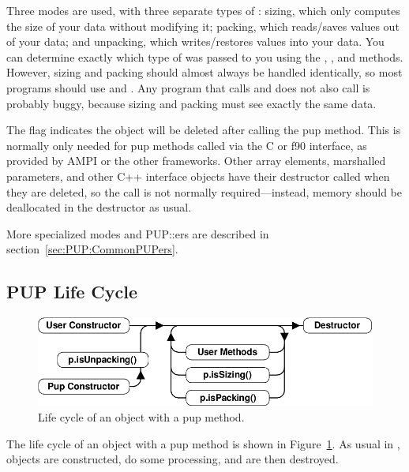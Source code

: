 Three modes are used, with three separate types of : 
sizing, which only computes the size of your data without modifying it;
packing, which reads/saves values out of your data; and unpacking,
which writes/restores values into your data.  You can determine
exactly which type of  was passed to you using the
, , and 
methods. However, sizing and packing should almost always be 
handled identically, so most programs should use 
and .  Any program that calls  
and does not also call  is probably buggy, because
sizing and packing must see exactly the same data.


The  flag indicates the object will be deleted
after calling the pup method.  This is normally only needed for
pup methods called via the C or f90 interface, as provided by 
AMPI or the other frameworks.  Other \charmpp{} array elements, 
marshalled parameters, and other C++ interface objects 
have their destructor called when they are deleted, so the 
 call is not normally required---instead,
memory should be deallocated in the destructor as usual.

More specialized modes and PUP::ers are described in section~\ref{sec:PUP:CommonPUPers}. 


\subsection{PUP Life Cycle}

\label{sec:lifecycle}

\begin{figure}[h]
\begin{center}
\includegraphics[width=6.0in]{fig/pup}
\end{center}
\caption{Life cycle of an object with a pup method.}
\label{fig:pup}
\end{figure}

The life cycle of an object with a pup method is shown in 
Figure~\ref{fig:pup}.  As usual in \CC{}, objects are 
constructed, do some processing, and are then destroyed.


